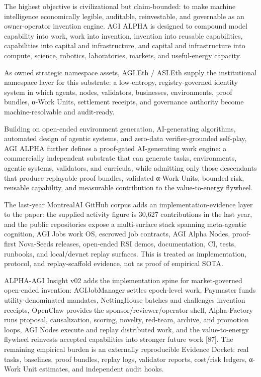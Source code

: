 \documentclass[
  11pt,
]{article}
\begin{document}
The highest objective is civilizational but claim-bounded: to make
machine intelligence economically legible, auditable, reinvestable, and
governable as an owner-operator invention engine. AGI ALPHA is designed
to compound model capability into work, work into invention, invention
into reusable capabilities, capabilities into capital and
infrastructure, and capital and infrastructure into compute, science,
robotics, laboratories, markets, and useful-energy capacity.

As owned strategic namespace assets, AGI.Eth / ASI.Eth supply the
institutional namespace layer for this substrate: a low-entropy,
registry-governed identity system in which agents, nodes, validators,
businesses, environments, proof bundles, α-Work Units, settlement
receipts, and governance authority become machine-resolvable and
audit-ready.

Building on open-ended environment generation, AI-generating algorithms,
automated design of agentic systems, and zero-data verifier-grounded
self-play, AGI ALPHA further defines a proof-gated AI-generating work
engine: a commercially independent substrate that can generate tasks,
environments, agentic systems, validators, and curricula, while
admitting only those descendants that produce replayable proof bundles,
validated α-Work Units, bounded risk, reusable capability, and
measurable contribution to the value-to-energy flywheel.

The last-year MontrealAI GitHub corpus adds an implementation-evidence
layer to the paper: the supplied activity figure is 30,627 contributions
in the last year, and the public repositories expose a multi-surface
stack spanning meta-agentic cognition, AGI Jobs work OS, escrowed job
contracts, AGI Alpha Nodes, proof-first Nova-Seeds releases, open-ended
RSI demos, documentation, CI, tests, runbooks, and local/devnet replay
surfaces. This is treated as implementation, protocol, and
replay-scaffold evidence, not as proof of empirical SOTA.

ALPHA-AGI Insight v02 adds the implementation spine for market-governed
open-ended invention: AGIJobManager settles epoch-level work, Paymaster
funds utility-denominated mandates, NettingHouse batches and challenges
invention receipts, OpenClaw provides the sponsor/reviewer/operator
shell, Alpha-Factory runs proposal, causalization, scoring, novelty,
red-team, archive, and promotion loops, AGI Nodes execute and replay
distributed work, and the value-to-energy flywheel reinvests accepted
capabilities into stronger future work {[}87{]}. The remaining empirical
burden is an externally reproducible Evidence Docket: real tasks,
baselines, proof bundles, replay logs, validator reports, cost/risk
ledgers, α-Work Unit estimates, and independent audit hooks.
\end{document}
